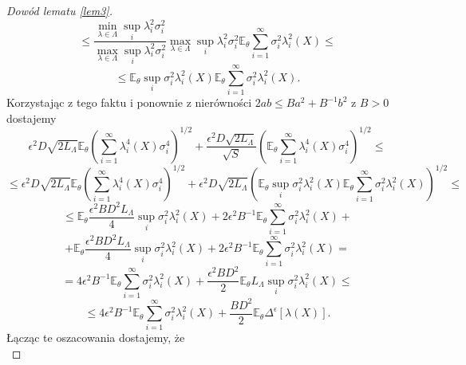 \documentclass{mwart}
\begin{document}
\begin{proof}[Dowód lematu \ref{lem3}]
\begin{displaymath}
\leq \frac{\min_{\lambda\in \Lambda}\sup_i \lambda_i^2\sigma_i^2}{\max_{\lambda\in \Lambda}\sup_i \lambda_i^2\sigma_i^2}\max_{\lambda\in \Lambda}\sup_i \lambda_i^2\sigma_i^2\mathbb{E}_{\theta}\sum_{i=1}^{\infty}\sigma_i^2\lambda_i^2(X)\leq
\end{displaymath}
\begin{displaymath}
\leq \mathbb{E}_{\theta}\sup_i\sigma_i^2\lambda_i^2(X)\mathbb{E}_{\theta}\sum_{i=1}^{\infty}\sigma_i^2\lambda_i^2(X).
\end{displaymath}
Korzystając z tego faktu i ponownie z nierówności $2ab\leq Ba^2+B^{-1}b^2$ z $B>0$ dostajemy
\begin{displaymath}
\epsilon^2D\sqrt{2L_{\Lambda}}\mathbb{E}_{\theta}\left(\sum_{i=1}^{\infty}\lambda_i^4(X)\sigma_i^4\right)^{1/2}+\frac{\epsilon^2D\sqrt{2L_{\Lambda}}}{\sqrt{S}}\left(\mathbb{E}_{\theta}\sum_{i=1}^{\infty}\lambda_i^4(X)\sigma_i^4\right)^{1/2}\leq
\end{displaymath}
\begin{displaymath}
\leq \epsilon^2D\sqrt{2L_{\Lambda}}\mathbb{E}_{\theta}\left(\sum_{i=1}^{\infty}\lambda_i^4(X)\sigma_i^4\right)^{1/2}+\epsilon^2D\sqrt{2L_{\Lambda}}\left(\mathbb{E}_{\theta}\sup_i\sigma_i^2\lambda_i^2(X)\mathbb{E}_{\theta}\sum_{i=1}^{\infty}\sigma_i^2\lambda_i^2(X)\right)^{1/2}\leq
\end{displaymath}
\begin{displaymath}
\leq \mathbb{E}_{\theta}\frac{\epsilon^2BD^2L_{\Lambda}}{4}\sup_i\sigma_i^2\lambda_i^2(X)+2\epsilon^2B^{-1}\mathbb{E}_{\theta}\sum_{i=1}^{\infty}\sigma_i^2\lambda_i^2(X)+
\end{displaymath}
\begin{displaymath}
+\mathbb{E}_{\theta}\frac{\epsilon^2BD^2L_{\Lambda}}{4}\sup_i\sigma_i^2\lambda_i^2(X)+2\epsilon^2B^{-1}\mathbb{E}_{\theta}\sum_{i=1}^{\infty}\sigma_i^2\lambda_i^2(X)=
\end{displaymath}
\begin{displaymath}
=4\epsilon^2B^{-1}\mathbb{E}_{\theta}\sum_{i=1}^{\infty}\sigma_i^2\lambda_i^2(X)+\frac{\epsilon^2BD^2}{2}\mathbb{E}_{\theta}L_{\Lambda}\sup_i\sigma_i^2\lambda_i^2(X)\leq
\end{displaymath}
\begin{displaymath}
\leq 4\epsilon^2B^{-1}\mathbb{E}_{\theta}\sum_{i=1}^{\infty}\sigma_i^2\lambda_i^2(X)+\frac{BD^2}{2}\mathbb{E}_{\theta}\Delta^{\epsilon}[\lambda(X)].
\end{displaymath}
Łącząc te oszacowania dostajemy, że
\begin{displaymath}

\end{displaymath}
\end{proof}
\end{document}
